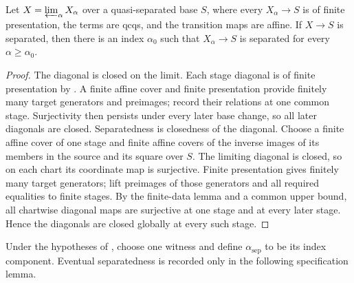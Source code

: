 \begin{lemma}
  \label{lemma:nagata-fixed-base-separated-stage-exists}

  Let $X=\varprojlim_\alpha X_\alpha$ over a quasi-separated base $S$, where
  every $X_\alpha\to S$ is of finite presentation, the terms are qcqs, and
  the transition maps are affine.  If $X\to S$ is separated, then there is an
  index $\alpha_0$ such that $X_\alpha\to S$ is separated for every
  $\alpha\geq\alpha_0$.
\end{lemma}

\begin{proof}
  The diagonal is closed on the limit.  Each stage diagonal is of finite
  presentation by .  A finite
  affine cover and finite
  presentation provide finitely many target generators and preimages; record
  their relations at one common stage. Surjectivity then persists under every
  later base change, so all later diagonals are closed.
  Separatedness is closedness of the diagonal.  Choose a finite affine cover
  of one stage and finite affine covers of the inverse images of its members
  in the source and its square over $S$.  The limiting diagonal is closed, so
  on each chart its coordinate map is surjective.  Finite presentation gives
  finitely many target generators; lift preimages of those generators and all
  required equalities to finite stages.  By the finite-data lemma and a common
  upper bound, all chartwise diagonal maps are surjective at one stage and at
  every later stage.  Hence the diagonals are closed globally at every such
  stage.
\end{proof}

\begin{definition}
  \label{def:nagata-fixed-base-separated-stage}

  Under the hypotheses of
  , choose one witness
  and define $\alpha_{\mathrm{sep}}$ to be its index component.  Eventual
  separatedness is recorded only in the following specification lemma.
\end{definition}

